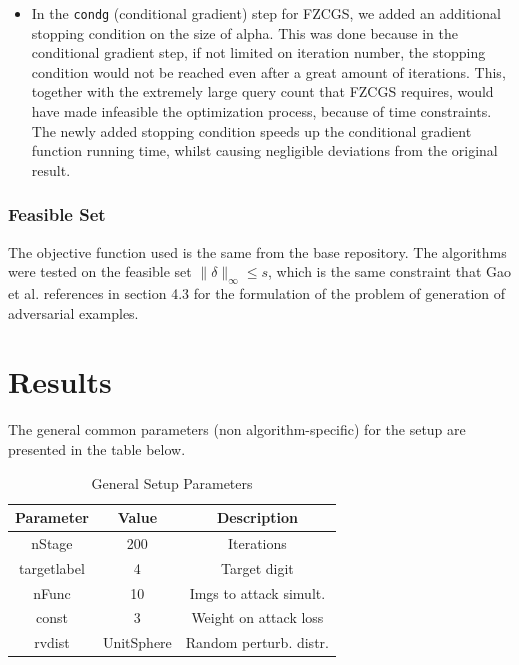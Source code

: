 \documentclass[10pt,twocolumn,letterpaper]{article}
\begin{document}
\begin{itemize}
   \item In the \texttt{condg} (conditional gradient) step for FZCGS,
   we added an additional stopping condition on the size of alpha.
   This was done because in the conditional gradient step, if not limited
   on iteration number, the stopping condition would not be reached even
   after a great amount of iterations. This, together with the extremely large query count
   that FZCGS requires, would have made infeasible the optimization process,
   because of time constraints. The newly added stopping condition speeds up
   the conditional gradient function running time, whilst causing negligible
   deviations from the original result.
\end{itemize}

\subsubsection{Feasible Set}

The objective function used is the same from the base repository.
The algorithms were tested on the feasible set $\|\delta\|_{\infty} \leq s$,
which is the same constraint that Gao et al.\cite{Gao} references in section 4.3 for the formulation
of the problem of generation of adversarial examples.


\section{Results}

The general common parameters (non algorithm-specific) for the setup are presented in the table below.

\begin{table}[h]
   \centering
   \begin{tabular}{ccc}
       \hline
       \textbf{Parameter} & \textbf{Value} & \textbf{Description} \\
       \hline
       nStage & 200 & Iterations\\
       \hline
       targetlabel & 4 & Target digit\\
       \hline
       nFunc & 10 & Imgs to attack simult.\\
       \hline
       const & 3 & Weight on attack loss\\
       \hline
       rvdist & UnitSphere & Random perturb. distr.\\ 
       \hline
   \end{tabular}\\
   \
   \caption{General Setup Parameters} 
   \label{tab:general_params}
\end{table}
\end{document}
